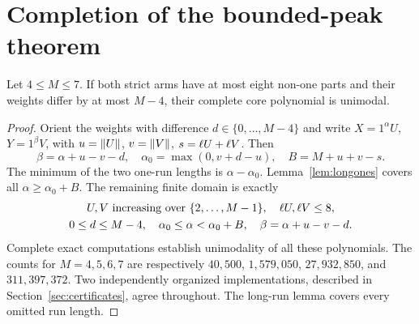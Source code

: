 \section{Completion of the bounded-peak theorem}
\begin{proposition}\label{prop:finitecomplement}
Let $4\le M\le7$. If both strict arms have at most eight non-one parts and their weights differ by at most $M-4$, their complete core polynomial is unimodal.
\end{proposition}
\begin{proof}
Orient the weights with difference $d\in\{0,\ldots,M-4\}$ and write $X=1^\alpha U$, $Y=1^\beta V$, with $u=\lVert U\rVert$, $v=\lVert V\rVert$, $s=\ell U+\ell V$. Then
\[
 \beta=\alpha+u-v-d,\quad \alpha_0=\max(0,v+d-u),\quad B=M+u+v-s.
\]
The minimum of the two one-run lengths is $\alpha-\alpha_0$. Lemma~\ref{lem:longones} covers all $\alpha\ge\alpha_0+B$. The remaining finite domain is exactly
\begin{equation}\label{eq:paddingdomain}
 \begin{gathered}
 U,V\text{ increasing over }\{2,\ldots,M-1\},\quad \ell U,\ell V\le8,\\
 0\le d\le M-4,\quad \alpha_0\le\alpha<\alpha_0+B,\quad
 \beta=\alpha+u-v-d.
 \end{gathered}
\end{equation}
Complete exact computations establish unimodality of all these polynomials. The counts for $M=4,5,6,7$ are respectively $40,500$, $1,579,050$, $27,932,850$, and $311,397,372$. Two independently organized implementations, described in Section~\ref{sec:certificates}, agree throughout. The long-run lemma covers every omitted run length.
\end{proof}

